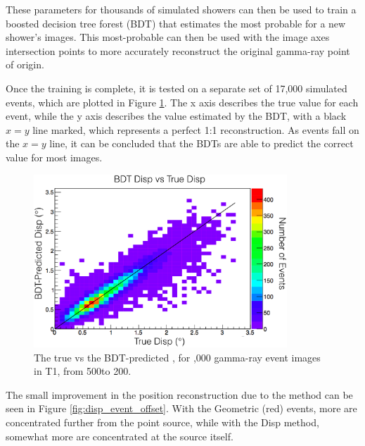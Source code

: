     These parameters for thousands of simulated showers can then be used to train a boosted decision tree forest (BDT) that estimates the most probable \disp{} for a new shower's images.
    This most-probable \disp{} can then be used with the image axes intersection points to more accurately reconstruct the original gamma-ray point of origin.
    
    Once the training is complete, it is tested on a separate set of 17,000 simulated events, which are plotted in Figure \ref{fig:disptraining}.
    The x axis describes the true \disp{} value for each event, while the y axis describes the \disp{} value estimated by the BDT, with a black $x=y$ line marked, which represents a perfect 1:1 \disp{} reconstruction.
    As events fall on the $x=y$ line, it can be concluded that the BDTs are able to predict the correct \disp{} value for most images.

    \begin{figure}[ht]
      \begin{center}
        \includegraphics[width=0.85\textwidth]{images/disp_training.eps}
        \caption[Disp BDT Training]{The true \disp{} vs the BDT-predicted \disp{}, for ,000 gamma-ray event images in T1, from 500\GeV to 200\TeV.}\label{fig:disptraining}
      \end{center}
    \end{figure}

    The small improvement in the position reconstruction due to the \disp{} method can be seen in Figure \ref{fig:disp_event_offset}.
    With the Geometric (red) events, more are concentrated further from the point source, while with the Disp method, somewhat more are concentrated at the source itself.

